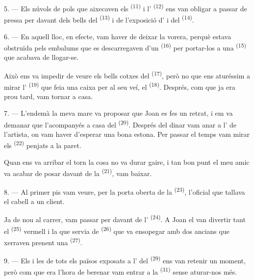 5. --- Els núvols de pols que aixecaven els  \textsuperscript{(11)} i
l' \textsuperscript{(12)} ens van obligar a passar de pressa per davant
dels bells  del
 \textsuperscript{(13)} i de l'exposició d' i
 del  \textsuperscript{(14)}.

6. --- En aquell lloc, en efecte, vam haver de deixar la vorera, perquè estava obstruïda pels
embalums que es descarregaven d'un  \textsuperscript{(16)} per
portar-los a una  \textsuperscript{(15)} que acabava de llogar-se.

Això ens va impedir de veure els bells cotxes del  \textsuperscript{(17)},
però no que ens aturéssim a mirar l' \textsuperscript{(19)} que feia una
caixa per al seu veí, el  \textsuperscript{(18)}.
Després, com que ja era prou tard, vam tornar a casa.

\VUsaut{3.0mm}

7. --- L'endemà la meva mare va proposar que Joan es fes un retrat, i em va demanar que
l'acompanyés a casa del  \textsuperscript{(20)}. Després del dinar vam anar a
l' de l'artista, on vam haver d'esperar una bona estona. Per passar el temps
vam mirar els  \textsuperscript{(22)} penjats a la paret.

Quan ens va arribar el torn la cosa no va durar gaire, i tan bon punt el meu amic va acabar de
posar davant de la  \textsuperscript{(21)}, vam baixar.

8. --- Al primer pis vam veure, per la porta oberta de la 
\textsuperscript{(23)}, l'oficial que tallava el cabell a un client.

Ja de nou al carrer, vam passar per davant de l' \textsuperscript{(24)}. A Joan
el van divertir tant el  \textsuperscript{(25)} vermell i la 
que servia de
 \textsuperscript{(26)} que va ensopegar amb dos ancians que
xerraven prenent una  \textsuperscript{(27)}.

\VUsaut{3.0mm}

9. --- Els  i les  de tots els països exposats a
l' del  \textsuperscript{(29)} ens van retenir un moment,
però com que era l'hora de berenar vam entrar a la  \textsuperscript{(31)}
sense aturar-nos més.

